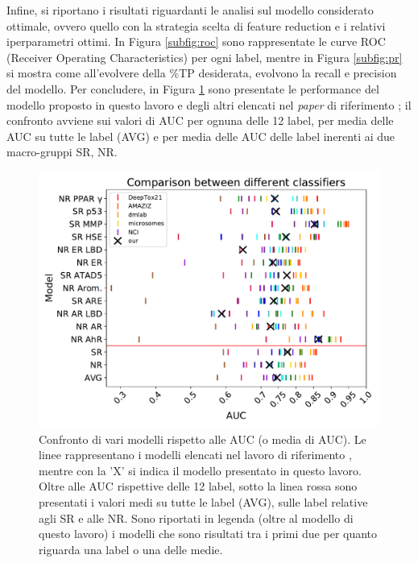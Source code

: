 Infine, si riportano i risultati riguardanti le analisi sul modello considerato ottimale, ovvero quello con la strategia scelta di feature reduction e i relativi iperparametri ottimi.
In Figura \ref{subfig:roc} sono rappresentate le curve ROC (Receiver Operating Characteristics) per ogni label, mentre in Figura \ref{subfig:pr} si mostra come all'evolvere della \%TP desiderata, evolvono la recall e precision del modello.
Per concludere, in Figura \ref{fig:comparison} sono presentate le performance del modello proposto in questo lavoro e degli altri elencati nel \textit{paper} di riferimento \cite{mayr2016deeptox}; il confronto avviene sui valori di AUC per ognuna delle 12 label, per media delle AUC su tutte le label (AVG) e per media delle AUC delle label inerenti ai due macro-gruppi SR, NR.
\begin{figure}[!t]
	\centering
	\includegraphics[width=0.9\linewidth]{../images/pdf/comparison}
	\caption{Confronto di vari modelli rispetto alle AUC (o media di AUC). Le linee rappresentano i modelli elencati nel lavoro di riferimento \cite{mayr2016deeptox}, mentre con la 'X' si indica il modello presentato in questo lavoro. Oltre alle AUC rispettive delle 12 label, sotto la linea rossa sono presentati i valori medi su tutte le label (AVG), sulle label relative agli SR e alle NR. Sono riportati in legenda (oltre al modello di questo lavoro) i modelli che sono risultati tra i primi due per quanto riguarda una label o una delle medie.}
	\label{fig:comparison}
\end{figure}